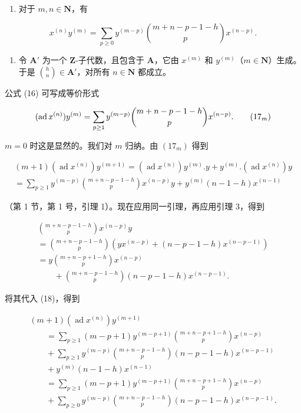 \begin{enumerate}
\def\labelenumi{(\roman{enumi})}
\tightlist
\item
  对于 \(m, n \in \mathbf{N}\)，有
\end{enumerate}

\[
x ^ {(n)} y ^ {(m)} = \sum_ {p \geq 0} y ^ {(m - p)} \binom{m + n - p - 1 - h}{p} x ^ {(n - p)}.\tag{16}
\]

\begin{enumerate}
\def\labelenumi{(\roman{enumi})}
\setcounter{enumi}{1}
\tightlist
\item
  令 \(\mathbf{A}'\) 为一个 \(\mathbf{Z}\)-子代数，且包含于 \(\mathbf{A}\)，它由 \(x^{(m)}\) 和 \(y^{(m)}\)（\(m \in \mathbf{N}\)）生成。于是 \(\binom{h}{n} \in \mathbf{A}'\)，对所有 \(n \in \mathbf{N}\) 都成立。
\end{enumerate}

公式 (16) 可写成等价形式

\[
(\operatorname{ad} x ^ {(n)}) y ^ {(m)} = \sum_ {p \geq 1} y ^ {(m - p)} \binom {m + n - p - 1 - h} {p} x ^ {(n - p)}.\tag{$17_{m}$}
\]

\(m = 0\) 时这是显然的。我们对 \(m\) 归纳。由 \((17_{m})\) 得到

\[
\begin{array}{l} (m + 1) (\operatorname{ad} x ^ {(n)}) y ^ {(m + 1)} = (\operatorname{ad} x ^ {(n)}) y ^ {(m)}. y + y ^ {(m)}. (\operatorname{ad} x ^ {(n)}) y \\ = \sum_ {p \geq 1} y ^ {(m - p)} \binom {m + n - p - 1 - h} {p} x ^ {(n - p)} y + y ^ {(m)} (n - 1 - h) x ^ {(n - 1)} \end{array} \tag {18}
\]

（第 1 节，第 1 号，引理 1）。现在应用同一引理，再应用引理 3，得到

\[
\begin{array}{l} \binom {m + n - p - 1 - h} {p} x ^ {(n - p)} y \\ = \binom {m + n - p - 1 - h} {p} (y x ^ {(n - p)} + (n - p - 1 - h) x ^ {(n - p - 1)}) \\ = y \binom {m + n - p + 1 - h} {p} x ^ {(n - p)} \\ \qquad + \binom {m + n - p - 1 - h} {p} (n - p - 1 - h) x ^ {(n - p - 1)}. \end{array}
\]

将其代入 (18)，得到

\[
\begin{array}{l} (m + 1) (\operatorname{ad} x ^ {(n)}) y ^ {(m + 1)} \\ \qquad = \sum_ {p \geq 1} (m - p + 1) y ^ {(m - p + 1)} \binom {m + n - p + 1 - h} {p} x ^ {(n - p)} \\ \qquad + \sum_ {p \geq 1} y ^ {(m - p)} \binom {m + n - p - 1 - h} {p} (n - p - 1 - h) x ^ {(n - p - 1)} \\ \qquad + y ^ {(m)} (n - 1 - h) x ^ {(n - 1)} \\ \qquad = \sum_ {p \geq 1} (m - p + 1) y ^ {(m - p + 1)} \binom {m + n - p + 1 - h} {p} x ^ {(n - p)} \\ \qquad + \sum_ {p \geq 0} y ^ {(m - p)} \binom {m + n - p - 1 - h} {p} (n - p - 1 - h) x ^ {(n - p - 1)}. \end{array}
\]

